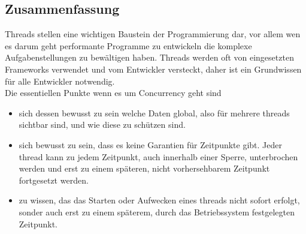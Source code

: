 \subsection{Zusammenfassung}
Threads stellen eine wichtigen Baustein der Programmierung dar, vor allem wen es darum geht performante Programme zu entwickeln die komplexe Aufgabenstellungen zu bewältigen haben. Threads werden oft von eingesetzten Frameworks verwendet und vom Entwickler versteckt, daher ist ein Grundwissen für alle Entwickler notwendig. 
\\Die essentiellen Punkte wenn es um Concurrency geht sind
\begin{itemize}
	\item sich dessen bewusst zu sein welche Daten global, also für mehrere threads sichtbar sind, und wie diese zu schützen sind. 
	\item sich bewusst zu sein, dass es keine Garantien für Zeitpunkte gibt. Jeder thread kann zu jedem Zeitpunkt, auch innerhalb einer Sperre, unterbrochen werden und erst zu einem späteren, nicht vorhersehbarem Zeitpunkt fortgesetzt werden.
	\item zu wissen, das das Starten oder Aufwecken eines threads nicht sofort erfolgt, sonder auch erst zu einem späterem, durch das Betriebssystem festgelegten Zeitpunkt.
\end{itemize}



